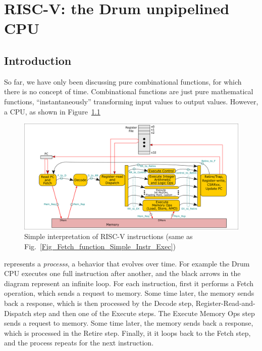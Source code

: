 

\chapter{RISC-V: the Drum unpipelined CPU}


\setcounter{page}{1}
\renewcommand{\thepage}{\arabic{chapter}-\arabic{page}}

\label{ch_Drum_code}


\section{Introduction}

So far, we have only been discussing pure combinational functions, for
which there is no concept of time.  Combinational functions are just
pure mathematical functions, ``instantaneously'' transforming input
values to output values.  However, a CPU, as shown in
Figure~\ref{Fig_Drum_Instr_Exec}
\begin{figure}[htbp]
  \centerline{\includegraphics[width=6in,angle=0]{ch030_RISCV_Design_Space/Figures/Fig_Instr_Exec_w_structs}}
  \caption{\label{Fig_Drum_Instr_Exec}
           Simple interpretation of RISC-V instructions
	   (same as Fig.~\ref{Fig_Fetch_function_Simple_Instr_Exec})}
\end{figure}
represents a \emph{processs}, a behavior that evolves over time.  For
example the Drum CPU executes one full instruction after another, and
the black arrows in the diagram represent an infinite loop. For each
instruction, first it performs a Fetch operation, which sends a
request to memory. Some time later, the memory sends back a response,
which is then processed by the Decode step, Register-Read-and-Dispatch
step and then one of the Execute steps.  The Execute Memory Ops step
sends a request to memory. Some time later, the memory sends back a
response, which is processed in the Retire step.  Finally, it it loops
back to the Fetch step, and the process repeats for the next
instruction.

